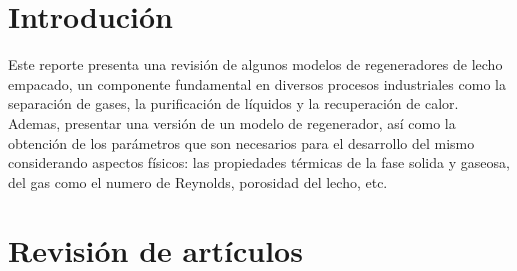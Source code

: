 \documentclass[12pt,letterpaper,final]{article}%
\begin{document}
\section{Introduci\'on}
Este reporte presenta una revisión de algunos modelos de regeneradores de lecho empacado, un componente fundamental en diversos procesos industriales como la separación de gases, la purificación de líquidos y la recuperación de calor. Ademas, presentar una versión de un modelo de regenerador, así como la obtención de los parámetros que son necesarios para el desarrollo del mismo considerando aspectos físicos: las propiedades térmicas de la fase solida y gaseosa, del gas como el numero de Reynolds, porosidad del lecho, etc.

\section{Revisión de artículos}
\end{document}
